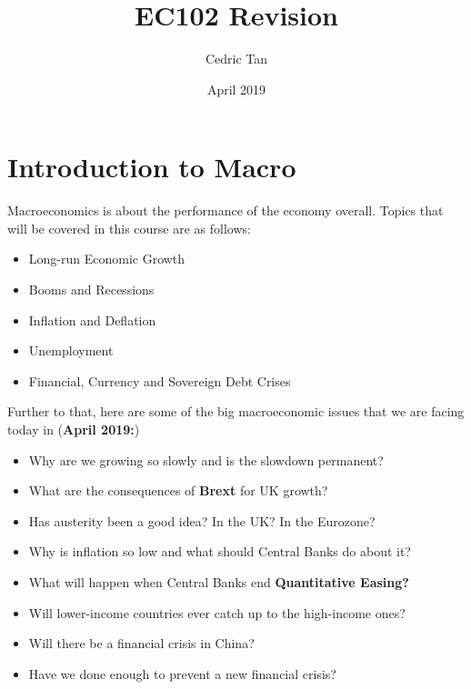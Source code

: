 \documentclass[12pt, letterpaper]{article}
\title{EC102 Revision}
\author{Cedric Tan}
\date{April 2019}
\begin{document}
\maketitle
{}

\newpage
\tableofcontents
\newpage

\section{Introduction to Macro}
Macroeconomics is about the performance of the economy overall. Topics that will be covered in this course are as follows:
\begin{itemize}
	\item Long-run Economic Growth
	\item Booms and Recessions
	\item Inflation and Deflation
	\item Unemployment
	\item Financial, Currency and Sovereign Debt Crises
\end{itemize}

Further to that, here are some of the big macroeconomic issues that we are facing today in (\textbf{April 2019:})
\begin{itemize}
	\item Why are we growing so slowly and is the slowdown permanent?
	\item What are the consequences of \textbf{Brext} for UK growth?
	\item Has austerity been a good idea? In the UK? In the Eurozone?
	\item Why is inflation so low and what should Central Banks do about it?
	\item What will happen when Central Banks end \textbf{Quantitative Easing?}
	\item Will lower-income countries ever catch up to the high-income ones?
	\item Will there be a financial crisis in China?
	\item Have we done enough to prevent a new financial crisis?
\end{itemize}
\end{document}
